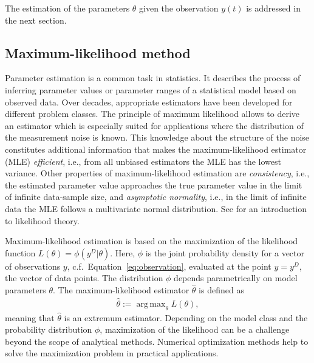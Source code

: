 \documentclass[article]{jss}
\DeclareMathOperator*{\argmax}{arg\,max}
\begin{document}
The estimation of the parameters $\theta$ given the observation $y(t)$ is addressed in the next section.


\subsection{Maximum-likelihood method}

Parameter estimation is a common task in statistics. It describes the process of inferring parameter values or parameter ranges of a statistical model based on observed data. Over decades, appropriate estimators have been developed for different problem classes. The principle of maximum likelihood allows to derive an estimator which is especially suited for applications where the distribution of the measurement noise is known. This knowledge about the structure of the noise constitutes additional information that makes the maximum-likelihood estimator (MLE) \textit{efficient}, i.e., from all unbiased estimators the MLE has the lowest variance. Other properties of maximum-likelihood estimation are \textit{consistency}, i.e., the estimated parameter value approaches the true parameter value in the limit of infinite data-sample size, and \textit{asymptotic normality}, i.e., in the limit of infinite data the MLE follows a multivariate normal distribution. See \cite{azzalini1996statistical} for an introduction to likelihood theory.

Maximum-likelihood estimation is based on the maximization of the likelihood function $L(\theta) = \phi(y^D|\theta)$. Here, $\phi$ is the joint probability density for a vector of observations $y$, c.f.~Equation~\ref{eq:observation}, evaluated at the point $y = y^D$, the vector of data points. The distribution $\phi$ depends parametrically on model parameters $\theta$. The maximum-likelihood estimator $\hat\theta$ is defined as
\begin{align*}
\hat \theta := \argmax_{\theta} L(\theta),
\end{align*}
meaning that $\hat\theta$ is an extremum estimator. Depending on the model class and the probability distribution $\phi$, maximization of the likelihood can be a challenge beyond the scope of analytical methods. Numerical optimization methods help to solve the maximization problem in practical applications.
\end{document}
